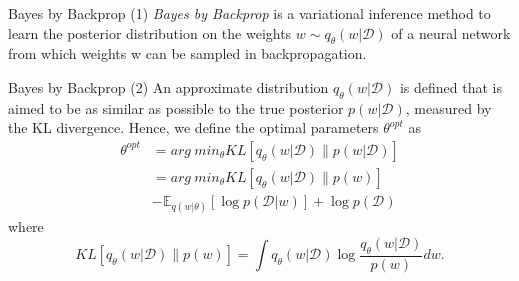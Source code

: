 \documentclass{beamer}
\begin{document}
\begin{frame}{Bayes by Backprop (1)}
  \textit{Bayes by Backprop} is a variational inference method to learn the posterior distribution
  on the weights $w \sim q_\theta(w|\mathcal{D})$ of a neural network from which weights w can be sampled in
  backpropagation.
\end{frame}
\begin{frame}{Bayes by Backprop (2)}
  An approximate distribution $q_\theta(w|\mathcal{D})$ is
  defined that is aimed to be as similar as possible to the true posterior $p(w|\mathcal{D})$, measured by
  the KL divergence. Hence, we define the optimal parameters $\theta^{opt}$ as
  \begin{equation}
    \begin{split}
      \theta^{opt} &= arg \  min_\theta KL [q_\theta(w|\mathcal{D}) \| p(w|\mathcal{D})] \\
      &= arg \  min_\theta KL [q_\theta(w|\mathcal{D}) \| p(w)] \\
      &- \mathbb{E}_{q(w|\theta)}[\log p(\mathcal{D}|w)] + \log p(\mathcal{D})
    \end{split}
  \end{equation}
  where
  \begin{equation}
    KL [q_\theta(w|\mathcal{D}) \| p(w)] = \int q_\theta(w|\mathcal{D}) \log \frac{q_\theta(w|\mathcal{D})}{p(w)}dw.
  \end{equation}
\end{frame}

\end{document}
